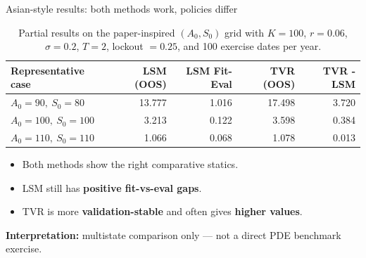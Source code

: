 \documentclass[
  11pt,
  ignorenonframetext,
  aspectratio=169,
]{beamer}
\begin{document}
\begin{frame}{Asian-style results: both methods work, policies differ}
\label{asian-style-results-both-methods-work-policies-differ}
\begin{table}
\small
\centering
\begin{tabular}{lrrrr}
\toprule
Representative case & LSM (OOS) & LSM Fit-Eval & TVR (OOS) & TVR - LSM \\
\midrule
$A_0=90,\ S_0=80$ & 13.777 & 1.016 & 17.498 & 3.720 \\
$A_0=100,\ S_0=100$ & 3.213 & 0.122 & 3.598 & 0.384 \\
$A_0=110,\ S_0=110$ & 1.066 & 0.068 & 1.078 & 0.013 \\
\bottomrule
\end{tabular}
\caption{Partial results on the paper-inspired $(A_0,S_0)$ grid with $K=100$, $r=0.06$, $\sigma=0.2$, $T=2$, lockout $=0.25$, and 100 exercise dates per year.}
\end{table}

\begin{itemize}
\item
  Both methods show the right comparative statics.
\item
  LSM still has \textbf{positive fit-vs-eval gaps}.
\item
  TVR is more \textbf{validation-stable} and often gives \textbf{higher
  values}.
\end{itemize}

\textbf{Interpretation:} multistate comparison only --- not a direct PDE
benchmark exercise.
\end{frame}
\end{document}
